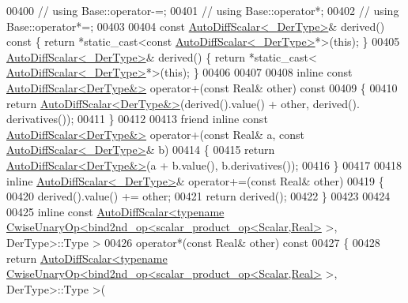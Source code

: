 \begin{DoxyCode}
00400 \textcolor{comment}{//   using Base::operator-=;}
00401 \textcolor{comment}{//   using Base::operator*;}
00402 \textcolor{comment}{//   using Base::operator*=;}
00403 
00404   \textcolor{keyword}{const} \hyperlink{class_eigen_1_1_auto_diff_scalar}{AutoDiffScalar<\_DerType>}& derived()\textcolor{keyword}{ const }\{ \textcolor{keywordflow}{return} *\textcolor{keyword}{static\_cast<}\textcolor{keyword}{const }
      \hyperlink{class_eigen_1_1_auto_diff_scalar}{AutoDiffScalar<\_DerType>}*\textcolor{keyword}{>}(\textcolor{keyword}{this}); \}
00405   \hyperlink{class_eigen_1_1_auto_diff_scalar}{AutoDiffScalar<\_DerType>}& derived() \{ \textcolor{keywordflow}{return} *\textcolor{keyword}{static\_cast<}
      \hyperlink{class_eigen_1_1_auto_diff_scalar}{AutoDiffScalar<\_DerType>}*\textcolor{keyword}{>}(\textcolor{keyword}{this}); \}
00406 
00407 
00408   \textcolor{keyword}{inline} \textcolor{keyword}{const} \hyperlink{class_eigen_1_1_auto_diff_scalar}{AutoDiffScalar<DerType&>} operator+(\textcolor{keyword}{const} Real& other)\textcolor{keyword}{ const}
00409 \textcolor{keyword}{  }\{
00410     \textcolor{keywordflow}{return} \hyperlink{class_eigen_1_1_auto_diff_scalar}{AutoDiffScalar<DerType&>}(derived().value() + other, derived().
      derivatives());
00411   \}
00412 
00413   \textcolor{keyword}{friend} \textcolor{keyword}{inline} \textcolor{keyword}{const} \hyperlink{class_eigen_1_1_auto_diff_scalar}{AutoDiffScalar<DerType&>} operator+(\textcolor{keyword}{const} Real& a, \textcolor{keyword}{const} 
      \hyperlink{class_eigen_1_1_auto_diff_scalar}{AutoDiffScalar<\_DerType>}& b)
00414   \{
00415     \textcolor{keywordflow}{return} \hyperlink{class_eigen_1_1_auto_diff_scalar}{AutoDiffScalar<DerType&>}(a + b.value(), b.derivatives());
00416   \}
00417 
00418   \textcolor{keyword}{inline} \hyperlink{class_eigen_1_1_auto_diff_scalar}{AutoDiffScalar<\_DerType>}& operator+=(\textcolor{keyword}{const} Real& other)
00419   \{
00420     derived().value() += other;
00421     \textcolor{keywordflow}{return} derived();
00422   \}
00423 
00424 
00425   \textcolor{keyword}{inline} \textcolor{keyword}{const} 
      \hyperlink{class_eigen_1_1_auto_diff_scalar}{AutoDiffScalar<typename CwiseUnaryOp<bind2nd\_op<scalar\_product\_op<Scalar,Real>}
       >, DerType>::Type >
00426   operator*(\textcolor{keyword}{const} Real& other)\textcolor{keyword}{ const}
00427 \textcolor{keyword}{  }\{
00428     \textcolor{keywordflow}{return} 
      \hyperlink{class_eigen_1_1_auto_diff_scalar}{AutoDiffScalar<typename CwiseUnaryOp<bind2nd\_op<scalar\_product\_op<Scalar,Real>}
       >, DerType>::Type >(

\end{DoxyCode}
